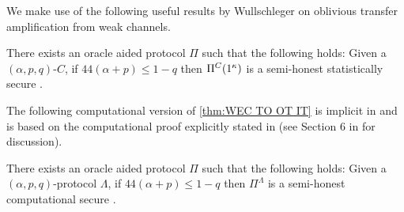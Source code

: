     
    

We make use of the following useful results by Wullschleger on oblivious transfer amplification from weak channels.
\begin{theorem}\label{thm:WEC TO OT IT}
    There exists an oracle aided protocol $\Pi$ such that the following holds: Given a $(\alpha,p,q)$-\WEC $C$, if $44(\alpha+p)\le 1-q$ then $\Pi^{C}(1^\kappa)$ is a semi-honest statistically secure \OT.
\end{theorem}

The following computational version of \cref{thm:WEC TO OT IT} is implicit in \cite{Wullschleger09} and is based on the computational proof explicitly stated in \cite{Wul07} (see Section 6 in \cite{Wullschleger09} for discussion).   

\begin{theorem}\label{thm:WEC TO OT Comp}
    There exists an oracle aided protocol $\Pi$ such that the following holds: Given a $(\alpha,p,q)$-\CompWEC protocol $\Lambda$, if $44(\alpha+p)\le 1-q$ then $\Pi^{\Lambda}$ is a semi-honest computational secure \OT.
\end{theorem}



